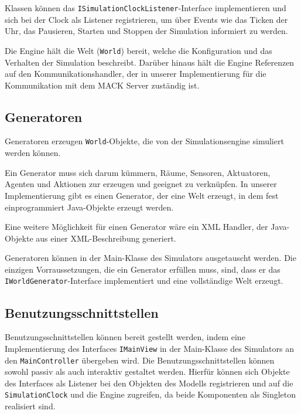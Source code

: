 Klassen können das \texttt{ISimulationClockListener}-Interface implementieren und sich bei der Clock als Listener registrieren, um über Events wie das Ticken der Uhr, das Pausieren, Starten und Stoppen der Simulation informiert zu werden.

Die Engine hält die Welt (\texttt{World}) bereit, welche die Konfiguration und das Verhalten der Simulation beschreibt. Darüber hinaus hält die Engine Referenzen auf den Kommunikationshandler, der in unserer Implementierung für die Kommunikation mit dem MACK Server zuständig ist.

\subsection{Generatoren}\label{subsec:concept_generators}
Generatoren erzeugen \texttt{World}-Objekte, die von der Simulationsengine simuliert werden können.

Ein Generator muss sich darum kümmern, Räume, Sensoren, Aktuatoren, Agenten und Aktionen zur erzeugen und geeignet zu verknüpfen. In unserer Implementierung gibt es einen Generator, der eine Welt erzeugt, in dem fest einprogrammiert Java-Objekte erzeugt werden.

Eine weitere Möglichkeit für einen Generator wäre ein XML Handler, der Java-Objekte aus einer XML-Beschreibung generiert.

Generatoren können in der Main-Klasse des Simulators ausgetauscht werden. Die einzigen Vorraussetzungen, die ein Generator erfüllen muss, sind, dass er das \texttt{IWorldGenerator}-Interface implementiert und eine vollständige Welt erzeugt.


\subsection{Benutzungsschnittstellen}\label{subsec:concept_interfaces}
Benutzungsschnittstellen können bereit gestellt werden, indem eine Implementierung des Interfaces \texttt{IMainView} in der Main-Klasse des Simulators an den \texttt{MainController} übergeben wird. Die Benutzungsschnittstellen können sowohl passiv als auch interaktiv gestaltet werden. Hierfür können sich Objekte des Interfaces als Listener bei den Objekten des Modells registrieren und auf die \texttt{SimulationClock} und die Engine zugreifen, da beide Komponenten als Singleton realisiert sind.

